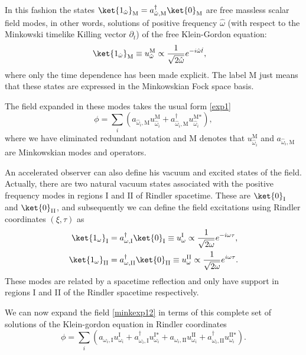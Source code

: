 In this fashion the states $\ket{1_{\hat \omega}}_\text{M}=a^\dagger_{\hat
\omega,\text{M}}\ket{0}_\text{M}$ are free massless scalar field
modes, in other words, solutions of positive frequency $\hat\omega$
(with respect to the Minkowski timelike Killing vector $\partial_{
t}$) of the free Klein-Gordon equation:
\begin{align}\label{modmin}
\ket{1_{\hat\omega}}_\text{M}&\equiv u_{\hat\omega}^\text{M}\propto\frac{1}{\sqrt{2{\hat \omega}}}e^{-i {\hat \omega} \hat t},
\end{align}
where only the time dependence has been made explicit. The label $\text{M}$ just means that these states are expressed in the Minkowskian Fock space basis.

The field expanded in these modes takes the usual form \eqref{exp1}
\begin{equation}\label{minkexp12}
\phi=\sum_i \left(a_{\hat\omega_i,\text{M}}u_{\hat\omega_i}^\text{M}+a_{\hat\omega_i,\text{M}}^\dagger u_{\hat\omega_i}^{\text{M}*}\right),
\end{equation}
where we have eliminated redundant notation and M denotes that $u_{\hat\omega_i}^\text{M}$ and $a_{\hat\omega_i,\text{M}}$ are Minkowskian modes and operators.

An accelerated observer   can also define his vacuum and excited states
of the field. Actually, there are two natural vacuum states associated
with the positive frequency modes in regions $\text{I}$ and $\text{II}$
of Rindler spacetime. These are $\ket{0}_\text{I}$ and
$\ket{0}_{\text{II}}$, and subsequently we can define the field
excitations using Rindler coordinates $(\xi,\tau)$ as
\begin{align}\label{modrin}
\ket{1_\omega}_\text{I}&=a^\dagger_{\omega,\text{I}}\ket{0}_\text{I}
\equiv u_\omega^\text{I}\propto\frac{1}{\sqrt{2\omega}}e^{-i\omega  \tau},\nonumber\\
\ket{1_\omega}_{\text{II}}&=a^\dagger_{\omega,\text{II}}\ket{0}_\text{II}
\equiv u_\omega^\text{II}\propto\frac{1}{\sqrt{2\omega}}e^{i\omega  \tau}.
\end{align}
These modes are related by a spacetime reflection and only have support in regions I and II of the
Rindler spacetime respectively.

We can now expand the field \eqref{minkexp12} in terms of this complete set of solutions of the Klein-gordon equation in Rindler coordinates
\begin{equation}\label{rindexp1}
\phi=\sum_i \left(a_{\omega_i,\text{I}}u_{\omega_i}^\text{I}+a_{\omega_i,\text{I}}^\dagger u_{\omega_i}^{\text{I}*}+a_{\omega_i,\text{II}}u_{\omega_i}^\text{II}+a_{\omega_i,\text{II}}^\dagger u_{\omega_i}^{\text{II}*}\right).
\end{equation}

